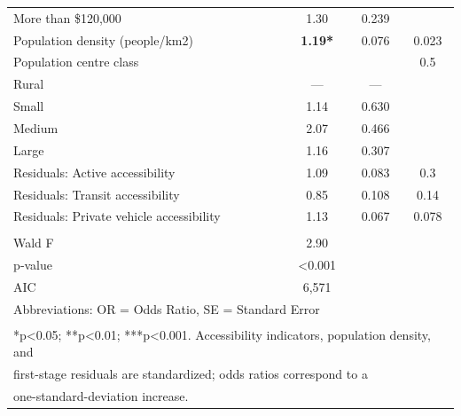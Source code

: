 \documentclass[preprint, 3p,
authoryear]{elsarticle} %
\begin{document}
\begin{table}
\begin{tabular}[t]{lccc}
\addlinespace
\hspace{1em}More than \$120,000 & 1.30 & 0.239 & \\
Population density (people/km2) & \textbf{1.19*} & 0.076 & 0.023\\
Population centre class &  &  & 0.5\\
\hspace{1em}Rural & — & — & \\
\hspace{1em}Small & 1.14 & 0.630 & \\
\addlinespace
\hspace{1em}Medium & 2.07 & 0.466 & \\
\hspace{1em}Large & 1.16 & 0.307 & \\
Residuals: Active accessibility & 1.09 & 0.083 & 0.3\\
Residuals: Transit accessibility & 0.85 & 0.108 & 0.14\\
Residuals: Private vehicle accessibility & 1.13 & 0.067 & 0.078\\
\midrule\\
\addlinespace
Wald F & 2.90 &  & \\
p‑value & <0.001 &  & \\
AIC & 6,571 &  & \\
\bottomrule
\multicolumn{4}{l}{\rule{0pt}{1em}Abbreviations: OR = Odds Ratio, SE = Standard Error}\\
\multicolumn{4}{l}{\textsuperscript{} *p<0.05; **p<0.01; ***p<0.001.  Accessibility indicators, population density, and}\\
\multicolumn{4}{l}{first-stage residuals are standardized; odds ratios correspond to a}\\
\multicolumn{4}{l}{one-standard-deviation increase.}\\
\end{tabular}
\end{table}

\renewcommand\refname{References}

\end{document}
